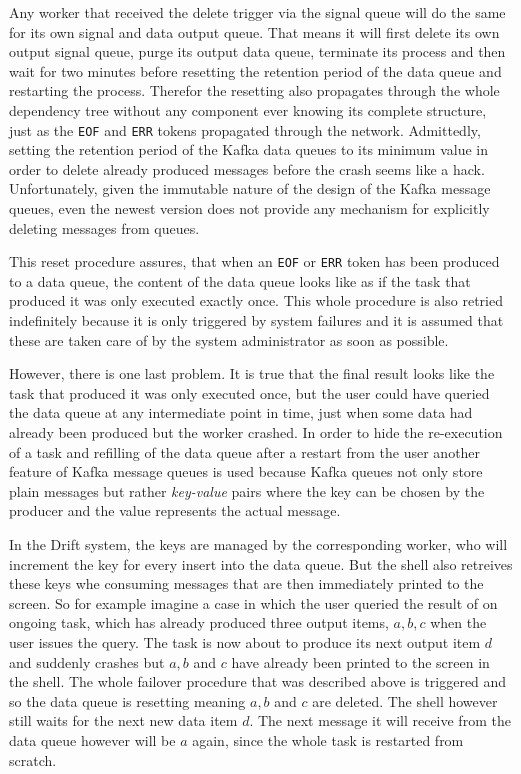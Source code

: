 Any worker that received the delete trigger via the signal queue
will do the same for its own signal and data output queue. That
means it will first delete its own output signal queue, purge
its output data queue, terminate its process and then wait for
two minutes before resetting the retention period of the data queue
and restarting the process.
Therefor the resetting also propagates through the whole dependency
tree without any component ever knowing its complete structure,
just as the \texttt{EOF} and \texttt{ERR} tokens propagated through
the network.
Admittedly, setting the retention period of the Kafka data queues
to its minimum value in order to delete already produced messages
before the crash seems like a hack. Unfortunately, given the
immutable nature of the design of the Kafka message queues, even
the newest version does not provide any mechanism for explicitly
deleting messages from queues.

This reset procedure assures, that when an \texttt{EOF} or
\texttt{ERR} token has been produced to a data queue, the content
of the data queue looks like as if the task that produced it
was only executed exactly once. This whole procedure is also
retried indefinitely because it is only triggered by system
failures and it is assumed that these are taken care of by
the system administrator as soon as possible.
\newline

However, there is one last problem. It is true that the final
result looks like the task that produced it was only executed once,
but the user could have queried the data queue at any intermediate
point in time, just when some data had already been produced
but the worker crashed. In order to hide the re-execution of a
task and refilling of the data queue after a restart from the user
another feature of Kafka message queues is used because
Kafka queues not only store plain messages but rather
\textit{key-value} pairs where the key can be chosen
by the producer and the value represents the actual message.

In the Drift system, the keys are managed by the corresponding
worker, who will increment the key for every insert into the
data queue. But the shell also retreives these keys whe
consuming messages that are then immediately printed to the
screen. So for example imagine a case in which the user queried
the result of on ongoing task, which has already produced three
output items, $a, b, c$ when the user issues the query.
The task is now about to produce its next output item $d$ and
suddenly crashes but $a, b$ and $c$ have already been printed
to the screen in the shell. The whole failover procedure that
was described above is triggered and so the data queue is resetting
meaning $a, b$ and $c$ are deleted. The shell however still waits
for the next new data item $d$. The next message it will receive
from the data queue however will be $a$ again, since the whole
task is restarted from scratch.


